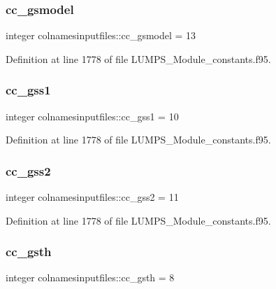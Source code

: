 \subsubsection{\texorpdfstring{cc\+\_\+gsmodel}{cc\_gsmodel}}
{\footnotesize\ttfamily integer colnamesinputfiles\+::cc\+\_\+gsmodel = 13}



Definition at line 1778 of file L\+U\+M\+P\+S\+\_\+\+Module\+\_\+constants.\+f95.

\mbox{\label{namespacecolnamesinputfiles_a921bc2e1949846db1a24b63e10326fb7}} 
\subsubsection{\texorpdfstring{cc\+\_\+gss1}{cc\_gss1}}
{\footnotesize\ttfamily integer colnamesinputfiles\+::cc\+\_\+gss1 = 10}



Definition at line 1778 of file L\+U\+M\+P\+S\+\_\+\+Module\+\_\+constants.\+f95.

\mbox{\label{namespacecolnamesinputfiles_ae18f5dc0d06b71aac4b8b8d19c52c3d5}} 
\subsubsection{\texorpdfstring{cc\+\_\+gss2}{cc\_gss2}}
{\footnotesize\ttfamily integer colnamesinputfiles\+::cc\+\_\+gss2 = 11}



Definition at line 1778 of file L\+U\+M\+P\+S\+\_\+\+Module\+\_\+constants.\+f95.

\mbox{\label{namespacecolnamesinputfiles_a18fd573ea9a56a00bf52ded29be82113}} 
\subsubsection{\texorpdfstring{cc\+\_\+gsth}{cc\_gsth}}
{\footnotesize\ttfamily integer colnamesinputfiles\+::cc\+\_\+gsth = 8}



